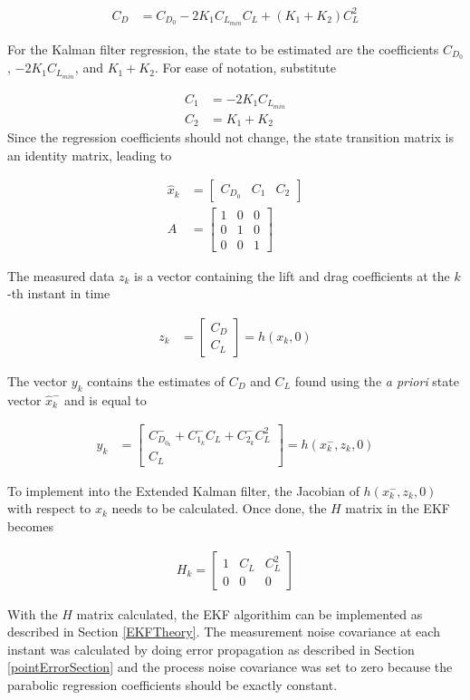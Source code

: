 \begin{align}
C_D &= C_{D_0}-2K_1C_{L_{min}}C_L+(K_1+K_2)C^2_L
\end{align}

For the Kalman filter regression, the state to be estimated are the coefficients $C_{D_0}$, $-2K_1C_{L_{min}}$, and $K_1+K_2$. For ease of notation, substitute

\begin{align}
C_1 &= -2K_1C_{L_{min}}\\
C_2 &= K_1+K_2
\end{align}Since the regression coefficients should not change, the state transition matrix is an identity matrix, leading to

\begin{align}
\hat{x}_k &= \begin{bmatrix}
C_{D_0} & C_1 & C_2
\end{bmatrix}\\
A &= \begin{bmatrix}
1&0&0\\0&1&0\\0&0&1
\end{bmatrix}
\end{align}


The measured data $z_k$ is a vector containing the lift and drag coefficients at the $k$-th instant in time

\begin{align}
z_k &= \begin{bmatrix}
C_D\\C_L
\end{bmatrix} = h(x_{k},0)
\end{align}


The vector $y_k$ contains the estimates of $C_D$ and $C_L$ found using the \textit{a priori} state vector $\hat{x}^-_k$ and is equal to

\begin{align}
y_k &= \begin{bmatrix} C^-_{D_{0_k}}+C^-_{1_k}C_L+C^-_{2_k}C^2_L \\ C_L \end{bmatrix} =h(x^-_k,z_k,0)
\end{align}


To implement into the Extended Kalman filter, the Jacobian of $h(x^-_k,z_k,0)$ with respect to $x_k$ needs to be calculated. Once done, the $H$ matrix in the EKF becomes

\begin{align}
H_k = \begin{bmatrix}
1 & C_L & C^2_L\\0&0&0
\end{bmatrix}
\end{align}


With the $H$ matrix calculated, the EKF algorithim can be implemented as described in Section \ref{EKFTheory}. The measurement noise covariance at each instant was calculated by doing error propagation as described in Section \ref{pointErrorSection} and the process noise covariance was set to zero because the parabolic regression coefficients should be exactly constant.
